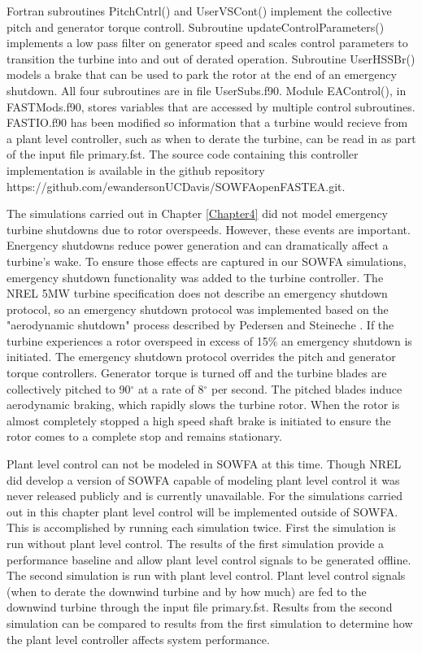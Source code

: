 Fortran subroutines PitchCntrl() and UserVSCont() implement the collective pitch and generator torque controll. Subroutine updateControlParameters() implements a low pass filter on generator speed and scales control parameters to transition the turbine into and out of derated operation. Subroutine UserHSSBr() models a brake that can be used to park the rotor at the end of an emergency shutdown. All four subroutines are in file UserSubs.f90. Module EAControl(), in FAST\textunderscore Mods.f90, stores variables that are accessed by multiple control subroutines. FAST\textunderscore IO.f90 has been modified so information that a turbine would recieve from a plant level controller, such as when to derate the turbine, can be read in as part of the input file primary.fst. The source code containing this controller implementation is available in the github repository https://github.com/ewandersonUCDavis/SOWFA\textunderscore openFAST\textunderscore EA.git.    

The simulations carried out in Chapter \ref{Chapter4} did not model emergency turbine shutdowns due to rotor overspeeds. However, these events are important. Energency shutdowns reduce power generation and can dramatically affect a turbine's wake. To ensure those effects are captured in our SOWFA simulations, emergency shutdown functionality was added to the turbine controller. The NREL 5MW turbine specification does not describe an emergency shutdown protocol\cite{jonkman2009}, so an emergency shutdown protocol was implemented based on the "aerodynamic shutdown" process described by Pedersen and Steineche \cite{pedersen2012}. If the turbine experiences a rotor overspeed in excess of 15\% an emergency shutdown is initiated. The emergency shutdown protocol overrides the pitch and generator torque controllers. Generator torque is turned off and the turbine blades are collectively pitched to 90$^{\circ}$ at a rate of 8$^{\circ}$ per second. The pitched blades induce aerodynamic braking, which rapidly slows the turbine rotor. When the rotor is almost completely stopped a high speed shaft brake is initiated to ensure the rotor comes to a complete stop and remains stationary.

Plant level control can not be modeled in SOWFA at this time. Though NREL did develop a version of SOWFA capable of modeling plant level control \cite{fleming2013,fleming2013a} it was never released publicly and is currently unavailable. For the simulations carried out in this chapter plant level control will be implemented outside of SOWFA. This is accomplished by running each simulation twice. First the simulation is run without plant level control. The results of the first simulation provide a performance baseline and allow plant level control signals to be generated offline. The second simulation is run with plant level control. Plant level control signals (when to derate the downwind turbine and by how much) are fed to the downwind turbine through the input file primary.fst. Results from the second simulation can be compared to results from the first simulation to determine how the plant level controller affects system performance. 

